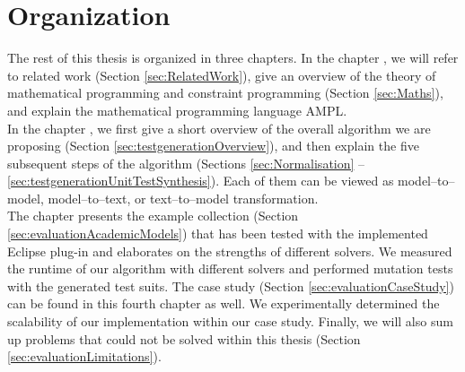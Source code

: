 \section{Organization}
The rest of this thesis is organized in three chapters. In the chapter , we will refer to related work (Section \ref{sec:RelatedWork}), %
give an overview of the theory of mathematical programming and constraint programming (Section \ref{sec:Maths}), and explain the mathematical programming language AMPL.\\
In the chapter , we first give a short overview of the overall algorithm we are proposing (Section \ref{sec:testgenerationOverview}), and then explain the five subsequent steps of the algorithm (Sections \ref{sec:Normalisation} -- \ref{sec:testgenerationUnitTestSynthesis}). Each of them can be viewed as model--to--model, model--to--text, or text--to--model transformation. 
\\
The chapter  presents the example collection (Section \ref{sec:evaluationAcademicModels}) that has been tested with the implemented Eclipse plug-in and elaborates on the strengths of different solvers. We measured the runtime of our algorithm with different solvers and performed mutation tests with the generated test suits. The case study (Section \ref{sec:evaluationCaseStudy}) can be found in this fourth chapter as well. We experimentally determined the scalability of our implementation within our case study. Finally, we will also sum up problems that could not be solved within this thesis (Section \ref{sec:evaluationLimitations}).
